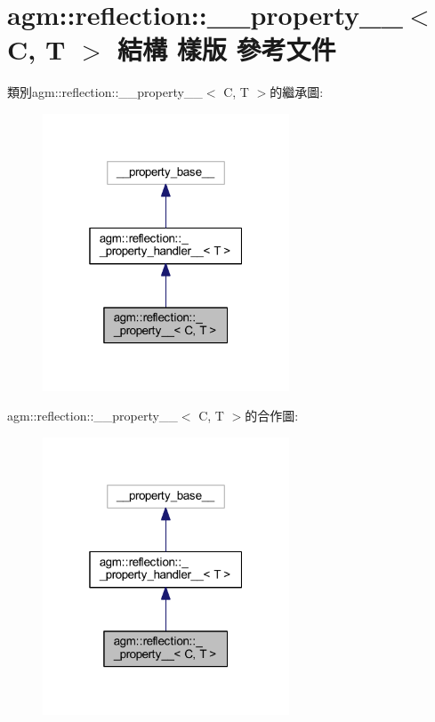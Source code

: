 \hypertarget{structagm_1_1reflection_1_1____property____}{}\section{agm\+:\+:reflection\+:\+:\+\_\+\+\_\+property\+\_\+\+\_\+$<$ C, T $>$ 結構 樣版 參考文件}
\label{structagm_1_1reflection_1_1____property____}


類別agm\+:\+:reflection\+:\+:\+\_\+\+\_\+property\+\_\+\+\_\+$<$ C, T $>$的繼承圖\+:\nopagebreak
\begin{figure}[H]
\begin{center}
\leavevmode
\includegraphics[width=208pt]{structagm_1_1reflection_1_1____property______inherit__graph}
\end{center}
\end{figure}


agm\+:\+:reflection\+:\+:\+\_\+\+\_\+property\+\_\+\+\_\+$<$ C, T $>$的合作圖\+:\nopagebreak
\begin{figure}[H]
\begin{center}
\leavevmode
\includegraphics[width=208pt]{structagm_1_1reflection_1_1____property______coll__graph}
\end{center}
\end{figure}
